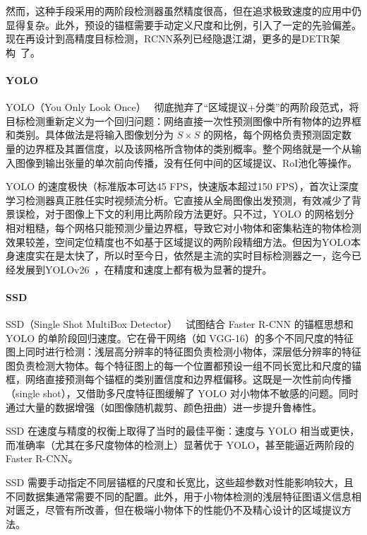 然而，这种手段采用的两阶段检测器虽然精度很高，但在追求极致速度的应用中仍显得复杂。此外，预设的锚框需要手动定义尺度和比例，引入了一定的先验偏差。现在再设计到高精度目标检测，RCNN系列已经隐退江湖，更多的是DETR架构~\cite{carion2020endtoendobjectdetectiontransformers}了。

\paragraph{YOLO}

YOLO（You Only Look Once）~\cite{redmon2016lookonceunifiedrealtime} 彻底抛弃了“区域提议+分类”的两阶段范式，将目标检测重新定义为一个回归问题：网络直接一次性预测图像中所有物体的边界框和类别。具体做法是将输入图像划分为 $S\times S$ 的网格，每个网格负责预测固定数量的边界框及其置信度，以及该网格所含物体的类别概率。整个网络就是一个从输入图像到输出张量的单次前向传播，没有任何中间的区域提议、RoI池化等操作。

YOLO 的速度极快（标准版本可达45 FPS，快速版本超过150 FPS），首次让深度学习检测器真正胜任实时视频流分析。它直接从全局图像出发预测，有效减少了背景误检，对于图像上下文的利用比两阶段方法更好。只不过，YOLO 的网格划分相对粗糙，每个网格只能预测少量边界框，导致它对小物体和密集粘连的物体检测效果较差，空间定位精度也不如基于区域提议的两阶段精细方法。但因为YOLO本身速度实在是太快了，所以时至今日，依然是主流的实时目标检测器之一，迄今已经发展到YOLOv26~\cite{sapkota2026yolo26keyarchitecturalenhancements}，在精度和速度上都有极为显著的提升。

\paragraph{SSD}

SSD（Single Shot MultiBox Detector）~\cite{Liu_2016} 试图结合 Faster R-CNN 的锚框思想和 YOLO 的单阶段回归速度。它在骨干网络（如 VGG-16）的多个不同尺度的特征图上同时进行检测：浅层高分辨率的特征图负责检测小物体，深层低分辨率的特征图负责检测大物体。每个特征图上的每一个位置都预设一组不同长宽比和尺度的锚框，网络直接预测每个锚框的类别置信度和边界框偏移。这既是一次性前向传播（single shot），又借助多尺度特征图缓解了 YOLO 对小物体不敏感的问题。同时通过大量的数据增强（如图像随机裁剪、颜色扭曲）进一步提升鲁棒性。

SSD 在速度与精度的权衡上取得了当时的最佳平衡：速度与 YOLO 相当或更快，而准确率（尤其在多尺度物体的检测上）显著优于 YOLO，甚至能逼近两阶段的 Faster R-CNN。

SSD 需要手动指定不同层锚框的尺度和长宽比，这些超参数对性能影响较大，且不同数据集通常需要不同的配置。此外，用于小物体检测的浅层特征图语义信息相对匮乏，尽管有所改善，但在极端小物体下的性能仍不及精心设计的区域提议方法。

